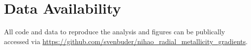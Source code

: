 \documentclass[fleqn,usenatbib]{mnras}
\begin{document}
\section*{Data Availability}

All code and data to reproduce the analysis and figures can be publically accessed via \url{https://github.com/svenbuder/nihao_radial_metallicity_gradients}.









\bsp	%
\label{lastpage}
\end{document}
